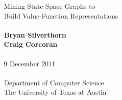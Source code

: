 \documentclass{beamer}
\begin{document}

\begin{frame}[plain]
\begin{center}
{\LARGE Mining State-Space Graphs to\\Build Value-Function Representations}
\ \\
\ \\
{\bf Bryan Silverthorn\\Craig Corcoran}
\ \\
\ \\
9 December 2011
\ \\
\ \\
Department of Computer Science\\
The University of Texas at Austin
\end{center}
\end{frame}



\end{document}
